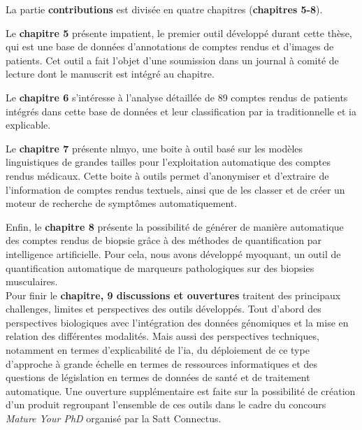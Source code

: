 La partie \textbf{contributions} est divisée en quatre chapitres (\textbf{chapitres 5-8}). 

Le \textbf{chapitre 5 }présente \gls{impatient}, le premier outil développé durant cette thèse, qui est une base de données d'annotations de comptes rendus et d'images de patients. Cet outil a fait l'objet d'une soumission dans un journal à comité de lecture dont le manuscrit est intégré au chapitre. 

Le \textbf{chapitre 6} s'intéresse à l'analyse détaillée de 89 comptes rendus de patients intégrés dans cette base de données et leur classification par \gls{ia} traditionnelle et \gls{ia} explicable.

Le \textbf{chapitre 7} présente \gls{nlmyo}, une boite à outil basé sur les modèles linguistiques de grandes tailles pour l'exploitation automatique des comptes rendus médicaux. Cette boite à outils permet d'anonymiser et d'extraire de l'information de comptes rendus textuels, ainsi que de les classer et de créer un moteur de recherche de symptômes automatiquement. 

Enfin, le \textbf{chapitre 8 }présente la possibilité de générer de manière automatique des comptes rendus de biopsie grâce à des méthodes de quantification par intelligence artificielle. Pour cela, nous avons développé \gls{myoquant}, un outil de quantification automatique de marqueurs pathologiques sur des biopsies musculaires. \\


Pour finir le \textbf{chapitre, 9 discussions et ouvertures} traitent des principaux challenges, limites et perspectives des outils développés. Tout d'abord des perspectives biologiques avec l'intégration des données génomiques et la mise en relation des différentes modalités. Mais aussi des perspectives techniques, notamment en termes d'explicabilité de l'\gls{ia}, du déploiement de ce type d'approche à grande échelle en termes de ressources informatiques et des questions de législation en termes de données de santé et de traitement automatique. Une ouverture supplémentaire est faite sur la possibilité de création d'un produit regroupant l'ensemble de ces outils dans le cadre du concours \textit{Mature Your PhD} organisé par la Satt Connectus.